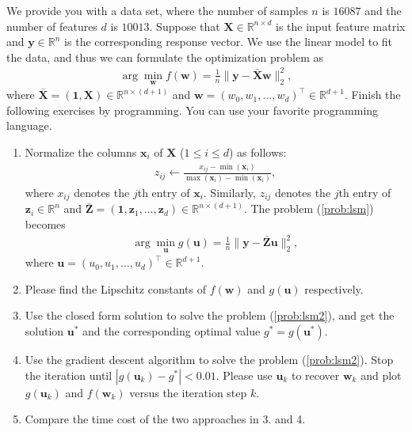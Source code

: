 \documentclass[11pt,letter,notitlepage]{article}
\begin{document}
\begin{exercise}
    We provide you with a data set, where the number of samples $n$ is $16087$ and the number of features $d$ is $10013$. Suppose that $\textbf{X}\in\mathbb{R}^{n\times d}$ is the input feature matrix and $\textbf{y}\in\mathbb{R}^n$ is the corresponding response vector. We use the linear model to fit the data, and thus we can formulate the optimization problem as 
    \begin{align}\label{prob:lsm}
        \arg\min_{\textbf{w}}f(\textbf{w}) = \frac{1}{n}\|\textbf{y}-\bar{\textbf{X}}\textbf{w}\|_2^2,
    \end{align}
    where $\bar{\textbf{X}}=(\textbf{1},\textbf{X})\in\mathbb{R}^{n\times(d+1)}$ and $\textbf{w}=(w_0,w_1,\dots,w_{d})^\top\in\mathbb{R}^{d+1}$.
    Finish the following exercises by programming. You can use your favorite programming language.
    \begin{enumerate}
        \item Normalize the columns $\textbf{x}_i$ of $\textbf{X}$ ($1\le i\le d$) as follows:
        \begin{align*}
            z_{ij}\leftarrow\frac{x_{ij}-\min (\textbf{x}_i)}{ \max (\textbf{x}_i) -  \min (\textbf{x}_i) },
        \end{align*}
        where $x_{ij}$ denotes the $j$th entry of $\textbf{x}_i$. Similarly, $z_{ij}$ denotes the $j$th entry of $\textbf{z}_i \in \mathbb{R}^n$ and $\bar{\textbf{Z}} = (\textbf{1},\textbf{z}_1,\dots,\textbf{z}_d)\in \mathbb{R}^{n\times(d+1)}$. The problem (\ref{prob:lsm}) becomes
        \begin{align}\label{prob:lsm2}
            \arg\min_{\textbf{u}}g(\textbf{u}) = \frac{1}{n}\|\textbf{y}-\bar{\textbf{Z}}\textbf{u}\|_2^2,
        \end{align}
        where $\textbf{u}=(u_0,u_1,\dots,u_{d})^\top\in\mathbb{R}^{d+1}$.
        \item Please find the Lipschitz constants of $f(\textbf{w})$ and $g(\textbf{u})$ respectively.
        \item Use the closed form solution to solve the problem (\ref{prob:lsm2}), and get the solution $\textbf{u}^*$ and the corresponding optimal value $g^* = g(\textbf{u}^*)$.
        \item Use the gradient descent algorithm to solve the problem (\ref{prob:lsm2}). Stop the iteration until $|g(\textbf{u}_k)-g^*|<0.01$. Please use $\textbf{u}_k$ to recover $\textbf{w}_k$ and plot $g(\textbf{u}_k)$ and $f(\textbf{w}_k)$ versus the iteration step $k$.
        \item Compare the time cost of the two approaches in 3. and 4.
    \end{enumerate}
\end{exercise}

\begin{solution}

\end{solution}


\end{document}
